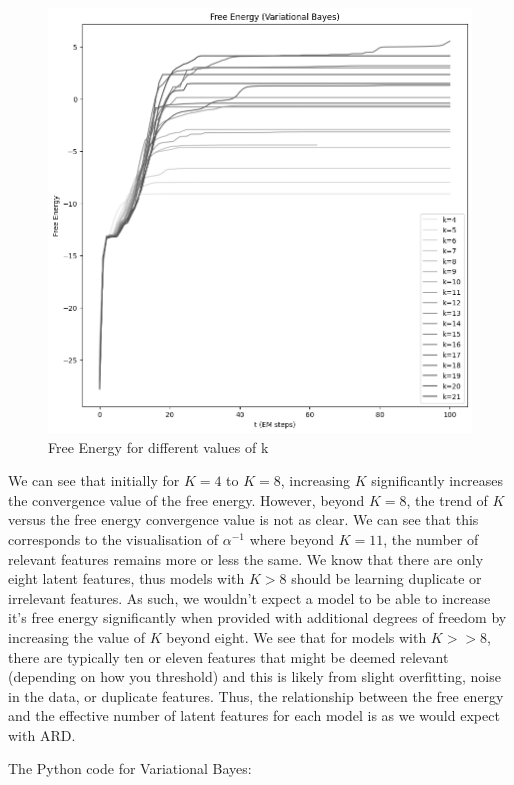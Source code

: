 \documentclass[12pt]{article}
\begin{document}
{\begin{figure}[h]
\centering
\includegraphics[scale=0.4]{outputs/q4/b-free-energy}
\caption{Free Energy for different values of k}
\label{fig:}
\end{figure}

We can see that initially for $K=4$ to $K=8$, increasing $K$ significantly increases the convergence value of the free energy. However, beyond $K=8$, the trend of $K$ versus the free energy convergence value is not as clear. We can see that this corresponds to the visualisation of $\alpha^{-1}$ where beyond $K=11$, the number of relevant features remains more or less the same. We know that there are only eight latent features, thus models with $K>8$ should be learning duplicate or irrelevant features. As such, we wouldn't expect a model to be able to increase it's free energy significantly when provided with additional degrees of freedom by increasing the value of $K$ beyond eight. We see that for models with $K>>8$, there are typically ten or eleven features that might be deemed relevant (depending on how you threshold) and this is likely from slight overfitting, noise in the data, or duplicate features. Thus, the relationship between the free energy and the effective number of latent features for each model is as we would expect with ARD.


\newpage
The Python code for Variational Bayes:


}
\end{document}
